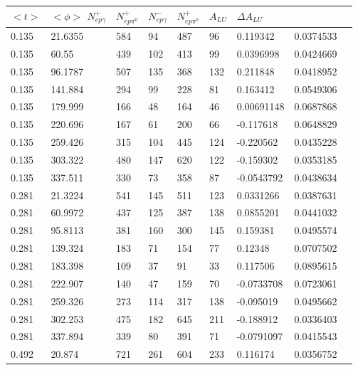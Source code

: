 \documentclass[12pt]{article}
\begin{document}
\begin{table}[!h]
   \begin{center}
      \begin{tabular}{||l|l|l|l|l|l|l|l|l||}
         \hline

$<t>$ & $<\phi>$ $N^{+}_{ep\gamma}$    &$N^{+}_{ep\pi^{0}}$   
         &$N^{-}_{ep\gamma}$   &$N^{+}_{ep\pi^{0}}$    &$A_{LU}$    &$\Delta 
         A_{LU}$\\
\hline
\hline
0.135    &21.6355 &584    &94   &487   &96    &0.119342    &0.0374533\\
         0.135    &60.55   &439    &102   &413   &99    &0.0396998    
         &0.0424669\\
0.135    &96.1787  &507    &135   &368   &132    &0.211848    &0.0418952\\
0.135    &141.884  &294    &99   &228   &81    &0.163412    &0.0549306\\
0.135    &179.999  &166    &48   &164   &46    &0.00691148    &0.0687868\\
0.135    &220.696  &167    &61   &200   &66    &-0.117618    &0.0648829\\
0.135    &259.426   &315    &104   &445   &124    &-0.220562    &0.0435228\\
0.135    &303.322    &480    &147   &620   &122    &-0.159302    &0.0353185\\
0.135    &337.511   &330    &73   &358   &87    &-0.0543792    &0.0438634\\
\hline
0.281    &21.3224  &541    &145   &511   &123    &0.0331266    &0.0387631\\
0.281    &60.9972  &437    &125   &387   &138    &0.0855201    &0.0441032\\
0.281    &95.8113  &381    &160   &300   &145    &0.159381    &0.0495574\\
0.281    &139.324  &183    &71   &154   &77    &0.12348    &0.0707502\\
0.281    &183.398  &109    &37   &91   &33    &0.117506    &0.0895615\\
0.281    &222.907  &140    &47   &159   &70    &-0.0733708    &0.0723061\\
0.281    &259.326   &273    &114   &317   &138    &-0.095019    &0.0495662\\
0.281    &302.253   &475    &182   &645   &211    &-0.188912    &0.0336403\\
0.281    &337.894   &339    &80   &391   &71    &-0.0791097    &0.0415543\\
\hline
0.492    &20.874  &721    &261   &604   &233    &0.116174    &0.0356752\\

\end{tabular}
\end{center}
\end{table}
\end{document}
